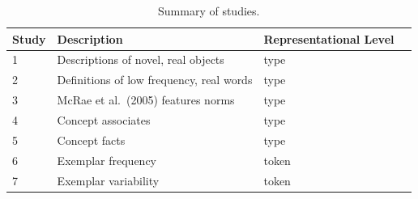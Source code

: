 
\begin{table}[t]
\footnotesize
\centering
\begin{tabular}{l l l l  }
 \toprule
 \textbf{Study} &  \textbf{Description} & \textbf{Representational Level}  \\
 \toprule

1  & Descriptions of novel, real objects & type   \\
2  & Definitions of low frequency, real words & type \\
3  & McRae et al.\ (2005) features norms & type  \\
4  & Concept associates & type    \\
5  & Concept facts & type  \\
6  & Exemplar frequency& token   \\
7  & Exemplar variability & token  \\
 \bottomrule
\end{tabular}
\caption{Summary of studies.}
\label{tab:complexity_pred_summary_table}
\end{table}












